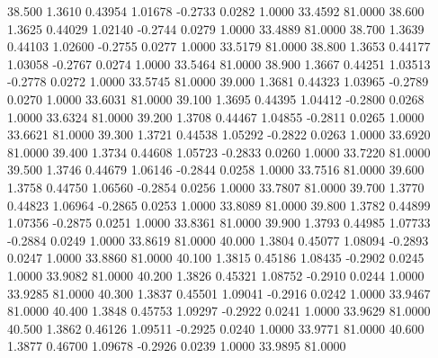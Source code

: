   38.500   1.3610   0.43954   1.01678  -0.2733   0.0282   1.0000  33.4592  81.0000
  38.600   1.3625   0.44029   1.02140  -0.2744   0.0279   1.0000  33.4889  81.0000
  38.700   1.3639   0.44103   1.02600  -0.2755   0.0277   1.0000  33.5179  81.0000
  38.800   1.3653   0.44177   1.03058  -0.2767   0.0274   1.0000  33.5464  81.0000
  38.900   1.3667   0.44251   1.03513  -0.2778   0.0272   1.0000  33.5745  81.0000
  39.000   1.3681   0.44323   1.03965  -0.2789   0.0270   1.0000  33.6031  81.0000
  39.100   1.3695   0.44395   1.04412  -0.2800   0.0268   1.0000  33.6324  81.0000
  39.200   1.3708   0.44467   1.04855  -0.2811   0.0265   1.0000  33.6621  81.0000
  39.300   1.3721   0.44538   1.05292  -0.2822   0.0263   1.0000  33.6920  81.0000
  39.400   1.3734   0.44608   1.05723  -0.2833   0.0260   1.0000  33.7220  81.0000
  39.500   1.3746   0.44679   1.06146  -0.2844   0.0258   1.0000  33.7516  81.0000
  39.600   1.3758   0.44750   1.06560  -0.2854   0.0256   1.0000  33.7807  81.0000
  39.700   1.3770   0.44823   1.06964  -0.2865   0.0253   1.0000  33.8089  81.0000
  39.800   1.3782   0.44899   1.07356  -0.2875   0.0251   1.0000  33.8361  81.0000
  39.900   1.3793   0.44985   1.07733  -0.2884   0.0249   1.0000  33.8619  81.0000
  40.000   1.3804   0.45077   1.08094  -0.2893   0.0247   1.0000  33.8860  81.0000
  40.100   1.3815   0.45186   1.08435  -0.2902   0.0245   1.0000  33.9082  81.0000
  40.200   1.3826   0.45321   1.08752  -0.2910   0.0244   1.0000  33.9285  81.0000
  40.300   1.3837   0.45501   1.09041  -0.2916   0.0242   1.0000  33.9467  81.0000
  40.400   1.3848   0.45753   1.09297  -0.2922   0.0241   1.0000  33.9629  81.0000
  40.500   1.3862   0.46126   1.09511  -0.2925   0.0240   1.0000  33.9771  81.0000
  40.600   1.3877   0.46700   1.09678  -0.2926   0.0239   1.0000  33.9895  81.0000
